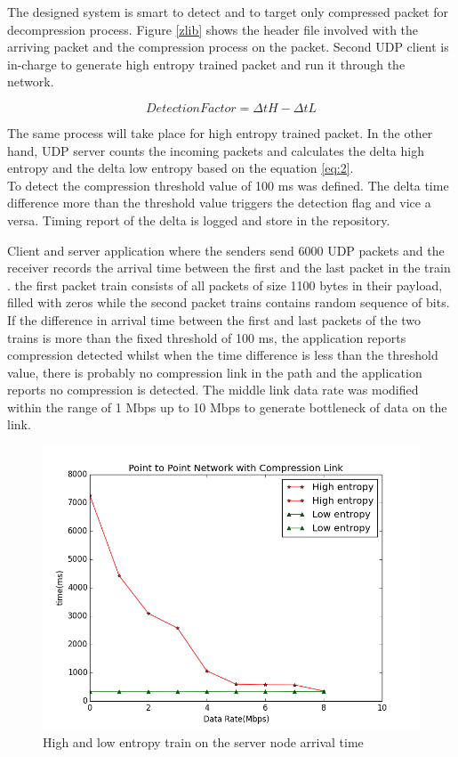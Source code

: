\documentclass[sigconf]{acmart}
\begin{document}
The designed system is smart to detect and to target only compressed packet for decompression process. Figure \ref{zlib} shows the header file involved with the arriving packet and the compression process on the packet. 
Second UDP client is in-charge to generate high entropy trained packet and run it through the network. 

\begin{equation}
 	DetectionFactor = \Delta tH - \Delta tL \label{eq:2}
\end{equation}


The same process will take place for high entropy trained packet. In the other hand, UDP server counts the incoming packets and calculates the delta high entropy and the delta low entropy based on the equation \ref{eq:2}.\\
To detect the compression threshold value of 100 ms was defined.  The delta time difference more than the threshold value triggers the detection flag and vice a versa. Timing report of the delta is logged and store in the repository.  
 
Client and server application where the senders send 6000 UDP packets and the receiver records the arrival time between the first and the last packet in the train . the first packet train consists of all packets of size 1100 bytes in their payload, filled with zeros while the second packet trains contains random sequence of bits. If the difference in arrival time between the first and last packets of the two trains is more than the fixed threshold of 100 ms, the application reports compression detected whilst when the time difference is less than the threshold value, there is probably no compression link in the path and the application reports no compression is detected. The middle link data rate was modified within the range of 1 Mbps up to 10 Mbps to generate bottleneck of data on the link. 

 \begin{figure}[h]
  \centering
  \includegraphics[width=\linewidth]{timing}
  \caption{High and low entropy train on the server node arrival time }
  \label{t1}
\end{figure} 
\end{document}

